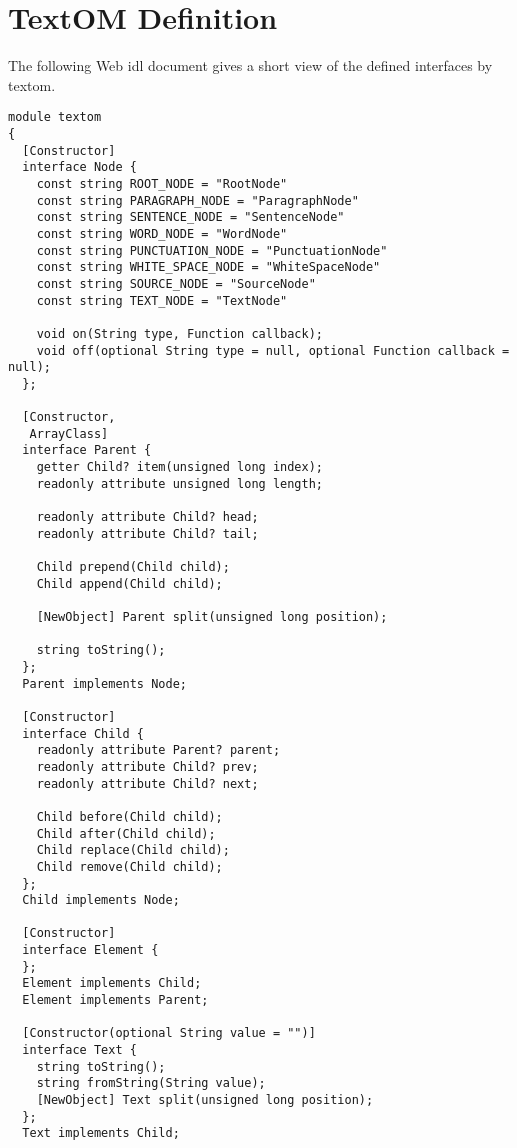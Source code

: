 
\chapter{TextOM Definition}\label{appendix-textom}

The following Web \acrshort{idl} document gives a short view of the defined
  interfaces by \gls{textom}.

\begin{lstlisting}
module textom
{
  [Constructor]
  interface Node {
    const string ROOT_NODE = "RootNode"
    const string PARAGRAPH_NODE = "ParagraphNode"
    const string SENTENCE_NODE = "SentenceNode"
    const string WORD_NODE = "WordNode"
    const string PUNCTUATION_NODE = "PunctuationNode"
    const string WHITE_SPACE_NODE = "WhiteSpaceNode"
    const string SOURCE_NODE = "SourceNode"
    const string TEXT_NODE = "TextNode"

    void on(String type, Function callback);
    void off(optional String type = null, optional Function callback = null);
  };

  [Constructor,
   ArrayClass]
  interface Parent {
    getter Child? item(unsigned long index);
    readonly attribute unsigned long length;

    readonly attribute Child? head;
    readonly attribute Child? tail;

    Child prepend(Child child);
    Child append(Child child);

    [NewObject] Parent split(unsigned long position);

    string toString();
  };
  Parent implements Node;

  [Constructor]
  interface Child {
    readonly attribute Parent? parent;
    readonly attribute Child? prev;
    readonly attribute Child? next;

    Child before(Child child);
    Child after(Child child);
    Child replace(Child child);
    Child remove(Child child);
  };
  Child implements Node;

  [Constructor]
  interface Element {
  };
  Element implements Child;
  Element implements Parent;

  [Constructor(optional String value = "")]
  interface Text {
    string toString();
    string fromString(String value);
    [NewObject] Text split(unsigned long position);
  };
  Text implements Child;


\end{lstlisting}
